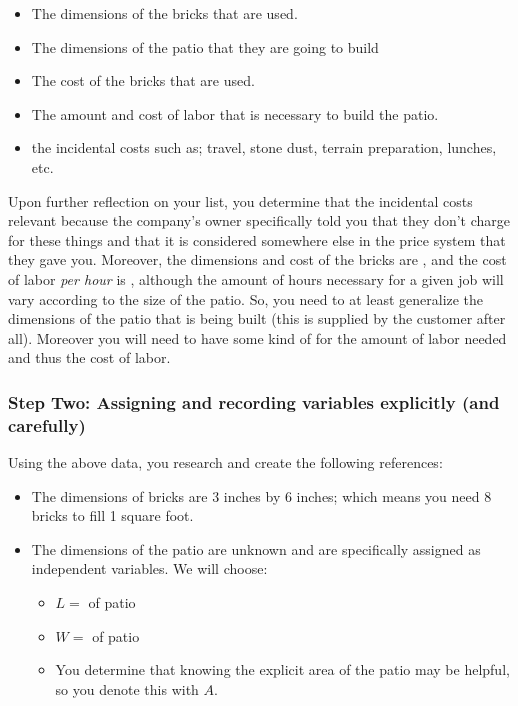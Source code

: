\documentclass{ximera}
\begin{document}
\begin{example}
        \begin{itemize}
            \item The dimensions of the bricks that are used.
            \item The dimensions of the patio that they are going to build
            \item The cost of the bricks that are used.
            \item The amount and cost of labor that is necessary to build the patio.
            \item the incidental costs such as; travel, stone dust, terrain preparation, lunches, etc.
        \end{itemize}
        
        Upon further reflection on your list, you determine that the incidental costs  relevant because the company's owner specifically told you that they don't charge for these things and that it is considered somewhere else in the price system that they gave you. Moreover, the dimensions and cost of the bricks are  , and the cost of labor \textit{per hour} is , although the amount of hours necessary for a given job will vary according to the size of the patio. So, you need to at least generalize the dimensions of the patio that is being built (this is supplied by the customer after all). Moreover you will need to have some kind of  for the amount of labor needed and thus the cost of labor. 
    
    \subsubsection*{Step Two: Assigning and recording variables explicitly (and carefully)}
        Using the above data, you research and create the following references:
        
        \begin{itemize}
            \item The dimensions of bricks are 3 inches by 6 inches; which means you need 8 bricks to fill 1 square foot.
            \item The dimensions of the patio are unknown and are specifically assigned as independent variables. We will choose:
            \begin{itemize}
                \item $L =$  of patio
                \item $W =$  of patio
                \item You determine that knowing the explicit area of the patio may be helpful, so you denote this with $A$.
            \end{itemize}
            

\end{itemize}
\end{example}
\end{document}
